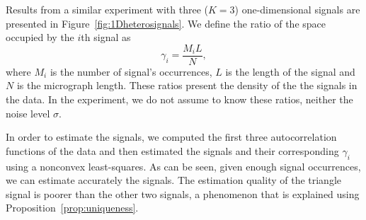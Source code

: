 \documentclass[english,11pt]{article}
\newcommand{\1}{\mathbf{1}}
\newcommand{\TODO}[1]{{\color{red}{[#1]}}}
\numberwithin{equation}{section}
\theoremstyle{plain}
\theoremstyle{definition}
\theoremstyle{remark}
\theoremstyle{plain}
\theoremstyle{remark}
\theoremstyle{plain}
\theoremstyle{plain}
\begin{document}
%


Results from a similar experiment with three ($K=3$) one-dimensional signals are presented in Figure~\ref{fig:1Dheterosignals}.
 We define the ratio of the space occupied by the $i$th signal as 
\begin{equation}
\gamma_i = \frac{M_i L}{N},
\end{equation}
where $M_i$ is the number of signal's  occurrences, $L$ is the length of the signal and $N$ is the micrograph length.
These ratios present the {density} of the the signals in the data.
In the experiment, we do not assume to know these ratios, neither the noise level $\sigma$. 

In order to estimate the signals, we computed the first three autocorrelation functions of the data and then estimated the signals and their corresponding $\gamma_i$ using a nonconvex least-squares. 
As can be seen, given enough signal occurrences, we can estimate accurately the signals. 
The estimation quality of the triangle signal is poorer than the other two signals, a phenomenon that is explained using Proposition~\ref{prop:uniqueness}.
\TODO{1. We will replace the figure with a ``progress figure'' (like we did for Einstien) for each signals and a plot of the recovery error for all three signals. 2. We may want to replace the triangle signal}
  
\end{document}
